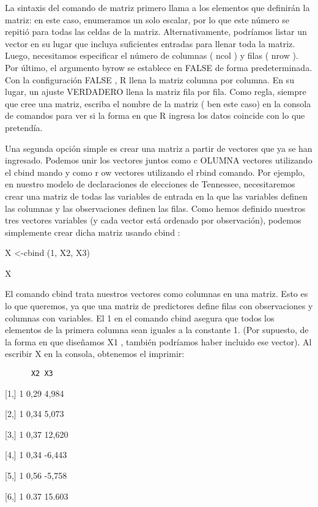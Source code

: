 \documentclass[
]{book}
\begin{document}
La sintaxis del comando de matriz primero llama a los elementos que definirán la matriz: en este caso, enumeramos un solo escalar, por lo que este número se repitió para todas las celdas de la matriz. Alternativamente, podríamos listar un vector en su lugar que incluya suficientes entradas para llenar toda la matriz. Luego, necesitamos especificar el número de columnas ( ncol ) y filas ( nrow ). Por último, el argumento byrow se establece en FALSE de forma predeterminada. Con la configuración FALSE , R llena la matriz columna por columna. En su lugar, un ajuste VERDADERO llena la matriz fila por fila. Como regla, siempre que cree una matriz, escriba el nombre de la matriz ( ben este caso) en la consola de comandos para ver si la forma en que R ingresa los datos coincide con lo que pretendía.

Una segunda opción simple es crear una matriz a partir de vectores que ya se han ingresado. Podemos unir los vectores juntos como c OLUMNA vectores utilizando el cbind mando y como r ow vectores utilizando el rbind comando. Por ejemplo, en nuestro modelo de declaraciones de elecciones de Tennessee, necesitaremos crear una matriz de todas las variables de entrada en la que las variables definen las columnas y las observaciones definen las filas. Como hemos definido nuestros tres vectores variables (y cada vector está ordenado por observación), podemos simplemente crear dicha matriz usando cbind :

X \textless-cbind (1, X2, X3)

X

El comando cbind trata nuestros vectores como columnas en una matriz. Esto es lo que queremos, ya que una matriz de predictores define filas con observaciones y columnas con variables. El 1 en el comando cbind asegura que todos los elementos de la primera columna sean iguales a la constante 1. (Por supuesto, de la forma en que diseñamos X1 , también podríamos haber incluido ese vector). Al escribir X en la consola, obtenemos el imprimir:

\begin{verbatim}
      X2 X3
\end{verbatim}

{[}1,{]} 1 0,29 4,984

{[}2,{]} 1 0,34 5,073

{[}3,{]} 1 0,37 12,620

{[}4,{]} 1 0,34 -6,443

{[}5,{]} 1 0,56 -5,758

{[}6,{]} 1 0.37 15.603
\end{document}
